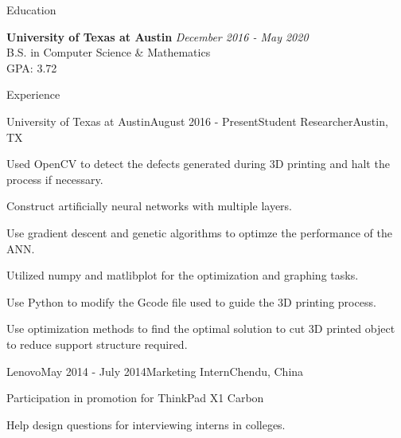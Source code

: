 \documentclass{resume} %
\begin{document}

\begin{rSection}{Education}

{\bf University of Texas at Austin} \hfill {\em December 2016 - May 2020} \\ 
B.S. in Computer Science \& Mathematics \\
GPA: 3.72

\end{rSection}


\begin{rSection}{Experience}

\begin{rSubsection}{University of Texas at Austin}{August 2016 - Present}{Student Researcher}{Austin, TX}
\item Used OpenCV to detect the defects generated during 3D printing and halt the process if necessary.
\item Construct artificially neural networks with multiple layers.
\item Use gradient descent and genetic algorithms to optimze the performance of the ANN.
\item Utilized numpy and matlibplot for the optimization and graphing tasks.
\item Use Python to modify the Gcode file used to guide the 3D printing process.
\item Use optimization methods to find the optimal solution to cut 3D printed object to reduce support structure required.

\end{rSubsection}
\begin{rSubsection}{Lenovo}{May 2014 - July 2014}{Marketing Intern}{Chendu, China}
\item Participation in promotion for ThinkPad X1 Carbon
\item Help design questions for interviewing interns in colleges.
\end{rSubsection}

\end{rSection}
\end{document}
